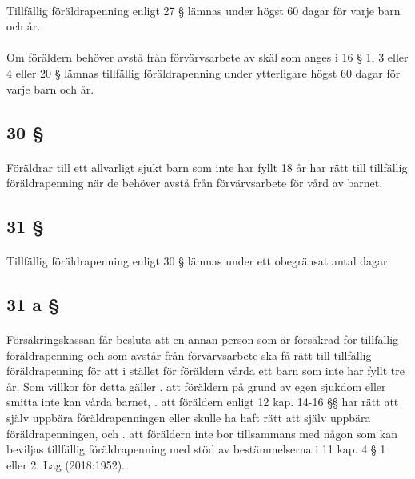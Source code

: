 \documentclass[a4paper,notitlepage,openany,10pt]{book}
\begin{document}
\paragraph*{}
Tillfällig föräldrapenning enligt 27 § lämnas under högst 60 dagar för varje barn och år.
\paragraph*{}
Om föräldern behöver avstå från förvärvsarbete av skäl som anges i 16 § 1, 3 eller 4 eller 20 § lämnas tillfällig föräldrapenning under ytterligare högst 60 dagar för varje barn och år.
\subsection*{30 §}
\paragraph*{}
Föräldrar till ett allvarligt sjukt barn som inte har fyllt 18 år har rätt till tillfällig föräldrapenning när de behöver avstå från förvärvsarbete för vård av barnet.
\subsection*{31 §}
\paragraph*{}
Tillfällig föräldrapenning enligt 30 § lämnas under ett obegränsat antal dagar.
\subsection*{31 a §}
\paragraph*{}
Försäkringskassan får besluta att en annan person som är försäkrad för tillfällig föräldrapenning och som avstår från förvärvsarbete ska få rätt till tillfällig föräldrapenning för att i stället för föräldern vårda ett barn som inte har fyllt tre år. Som villkor för detta gäller
. att föräldern på grund av egen sjukdom eller smitta inte kan vårda barnet,
. att föräldern enligt 12 kap. 14-16 §§ har rätt att själv uppbära föräldrapenningen eller skulle ha haft rätt att själv uppbära föräldrapenningen, och
. att föräldern inte bor tillsammans med någon som kan beviljas tillfällig föräldrapenning med stöd av bestämmelserna i 11 kap. 4 § 1 eller 2.
Lag (2018:1952).
\end{document}
